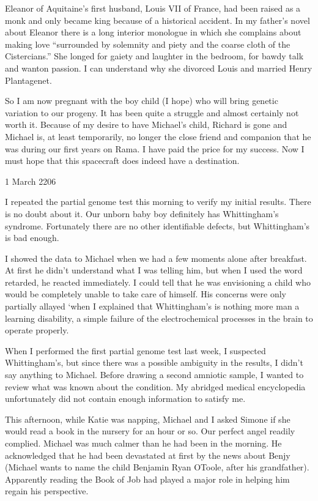 \documentclass[]{article}
\begin{document}
Eleanor of Aquitaine’s first husband, Louis VII of France, had been raised as a monk and only became king because of a historical accident. In my father’s novel about Eleanor there is a long interior monologue in which she complains about making love “surrounded by solemnity and piety and the coarse cloth of the Cistercians.” She longed for gaiety and laughter in the bedroom, for bawdy talk and wanton passion. I can understand why she divorced Louis and married Henry Plantagenet.

So I am now pregnant with the boy child (I hope) who will bring genetic variation to our progeny. It has been quite a struggle and almost certainly not worth it. Because of my desire to have Michael’s child, Richard is gone and Michael is, at least temporarily, no longer the close friend and companion that he was during our first years on Rama. I have paid the price for my success. Now I must hope that this spacecraft does indeed have a destination.

1 March 2206

I repeated the partial genome test this morning to verify my initial results. There is no doubt about it. Our unborn baby boy definitely has Whittingham’s syndrome. Fortunately there are no other identifiable defects, but Whittingham’s is bad enough.

I showed the data to Michael when we had a few moments alone after breakfast. At first he didn’t understand what I was telling him, but when I used the word retarded, he reacted immediately. I could tell that he was envisioning a child who would be completely unable to take care of himself. His concerns were only partially allayed ‘when I explained that Whittingham’s is nothing more man a learning disability, a simple failure of the electrochemical processes in the brain to operate properly.

When I performed the first partial genome test last week, I suspected Whittingham’s, but since there was a possible ambiguity in the results, I didn’t say anything to Michael. Before drawing a second amniotic sample, I wanted to review what was known about the condition. My abridged medical encyclopedia unfortunately did not contain enough information to satisfy me.

This afternoon, while Katie was napping, Michael and I asked Simone if she would read a book in the nursery for an hour or so. Our perfect angel readily complied. Michael was much calmer than he had been in the morning. He acknowledged that he had been devastated at first by the news about Benjy (Michael wants to name the child Benjamin Ryan OToole, after his grandfather). Apparently reading the Book of Job had played a major role in helping him regain his perspective.
\end{document}
